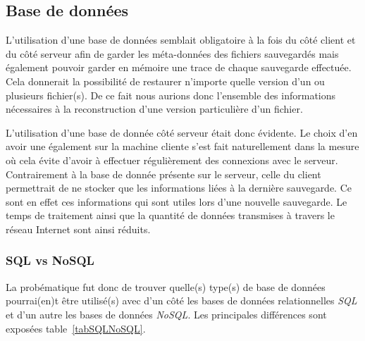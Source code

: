\documentclass[a4paper,10pt, twoside]{report}
\begin{document}
\begin{spacing}{1.2}
\subsection{Base de données}

L'utilisation d'une
base de données semblait obligatoire à la fois du côté client et du côté serveur
afin de garder les méta-données
des fichiers sauvegardés mais également pouvoir garder en mémoire une
trace de chaque sauvegarde effectuée. Cela donnerait la possibilité
de restaurer n'importe quelle version d'un ou plusieurs fichier(s). De ce fait
nous aurions donc l'ensemble des informations nécessaires à la
reconstruction d'une version particulière d'un fichier.

L'utilisation d'une base de donnée côté serveur était donc évidente.
Le choix d'en avoir une également sur la machine cliente s'est fait
naturellement dans la mesure où cela évite d'avoir à effectuer
régulièrement des connexions avec le serveur. Contrairement
à la base de donnée présente sur le serveur, celle du client permettrait
de ne stocker que les informations liées à la dernière sauvegarde. Ce
sont en effet ces informations qui sont utiles lors d'une nouvelle sauvegarde.
Le temps de traitement ainsi que la quantité de données transmises à travers
le réseau Internet sont ainsi réduits.

\subsubsection{SQL vs NoSQL}

La probématique fut donc de trouver quelle(s) type(s) de base de données
pourrai(en)t être utilisé(s) avec d'un côté les bases de données
relationnelles \textit{SQL} et d'un autre les bases de données \textit{NoSQL}.
Les principales différences sont exposées table~\ref{tabSQLNoSQL}.


\end{spacing}
\end{document}
